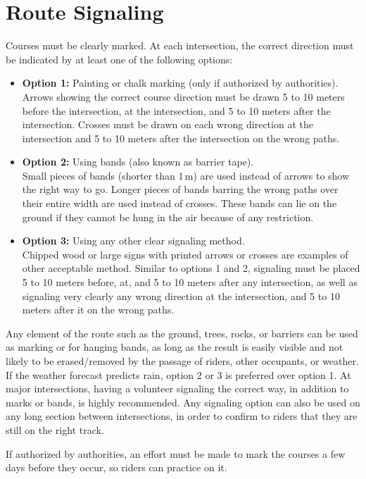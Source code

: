 \section{Route Signaling}
Courses must be clearly marked.
At each intersection, the correct direction must be indicated by at least one of the following options:
\begin{itemize}
\item \textbf{Option 1:} Painting or chalk marking (only if authorized by authorities).\\
Arrows showing the correct course direction must be drawn 5 to 10 meters before the intersection, at the intersection, and 5 to 10 meters after the intersection.
Crosses must be drawn on each wrong direction at the intersection and 5 to 10 meters after the intersection on the wrong paths.
\item \textbf{Option 2:} Using bands (also known as barrier tape).\\
Small pieces of bands (shorter than 1\,m) are used instead of arrows to show the right way to go.
Longer pieces of bands barring the wrong paths over their entire width are used instead of crosses.
These bands can lie on the ground if they cannot be hung in the air because of any restriction.
\item \textbf{Option 3:} Using any other clear signaling method.\\
Chipped wood or large signs with printed arrows or crosses are examples of other acceptable method.
Similar to options 1 and 2, signaling must be placed 5 to 10 meters before, at, and 5 to 10 meters after any intersection, as well as signaling very clearly any wrong direction at the intersection, and 5 to 10 meters after it on the wrong paths.
\end{itemize}
Any element of the route such as the ground, trees, rocks, or barriers can be used as marking or for hanging bands, as long as the result is easily visible and not likely to be erased/removed by the passage of riders, other occupants, or weather.
If the weather forecast predicts rain, option 2 or 3 is preferred over option 1.
At major intersections, having a volunteer signaling the correct way, in addition to marks or bands, is highly recommended.
Any signaling option can also be used on any long section between intersections, in order to confirm to riders that they are still on the right track.

If authorized by authorities, an effort must be made to mark the courses a few days before they occur, so riders can practice on it.

